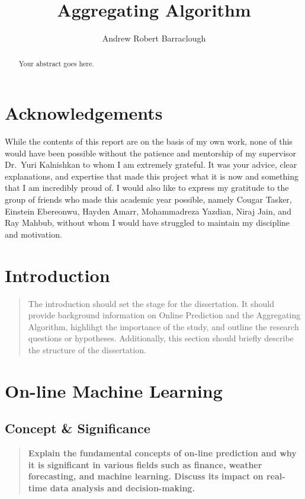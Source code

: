 \documentclass[11pt]{article} %
\title{Aggregating Algorithm}
\author{Andrew Robert Barraclough}
\theoremstyle{plain}
\theoremstyle{definition}
\begin{document}
\maketitle

\declaration

\begin{abstract}
  Your abstract goes here.
\end{abstract}

\section*{Acknowledgements}
While the contents of this report are on the basis of my own work, none of this would have been possible without the patience and mentorship of my supervisor Dr.\ Yuri Kalnishkan to whom I am extremely grateful. It was your advice, clear explanations, and expertise that made this project what it is now and something that I am incredibly proud of.
I would also like to express my gratitude to the group of friends who made this academic year possible, namely Cougar Tasker, Einstein Ebereonwu, Hayden Amarr, Mohammadreza Yazdian, Niraj Jain, and Ray Mahbub, without whom I would have struggled to maintain my discipline and motivation.
\newpage

\section{Introduction}
\begin{quote}
  The introduction should set the stage for the dissertation. It should provide background information on Online Prediction and the Aggregating Algorithm, highlihgt the importance of the study, and outline the research questions or hypotheses. Additionally, this section should briefly describe the structure of the dissertation.
\end{quote}

\newpage

\section{On-line Machine Learning}
\subsection{Concept \& Significance}
\begin{quote}
  \textbf{Explain the fundamental concepts of on-line prediction and why it is significant in various fields such as finance, weather forecasting, and machine learning. Discuss its impact on real-time data analysis and decision-making.}
\end{quote}
\end{document}
